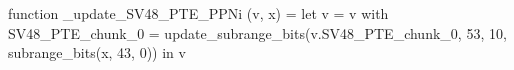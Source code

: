 function _update_SV48_PTE_PPNi (v, x) = let v = { v with SV48_PTE_chunk_0 = update_subrange_bits(v.SV48_PTE_chunk_0, 53, 10, subrange_bits(x, 43, 0)) } in
  v
